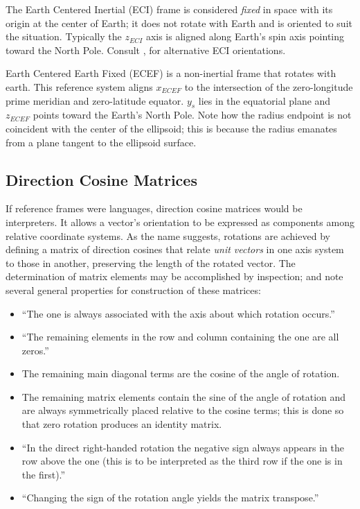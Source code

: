 \documentclass[12pt]{ucthesis}
\begin{document}
The Earth Centered Inertial (ECI) frame is considered \textit{fixed} in space with its origin at the center of Earth; it does not rotate with Earth and is oriented to suit the situation. Typically the $z_{ECI}$ axis is aligned along Earth's spin axis pointing toward the North Pole. Consult \citet[Pg. 20]{Stevens1992}, for alternative ECI orientations.

Earth Centered Earth Fixed (ECEF) is a non-inertial frame that rotates with earth. This reference system aligns  $x_{ECEF}$ to the intersection of the zero-longitude prime meridian and zero-latitude equator. $y_s$ lies in the equatorial plane and $z_{ECEF}$ points toward the Earth's North Pole. Note how the radius endpoint is not coincident with the center of the ellipsoid; this is because the radius emanates from a plane tangent to the ellipsoid surface. 

\subsection{Direction Cosine Matrices}
\label{subsec: new_dcm}
If reference frames were languages, direction cosine matrices would be interpreters. It allows a vector's orientation to be expressed as components among relative coordinate systems. As the name suggests, rotations are achieved by defining a matrix of direction cosines that relate \textit{unit vectors} in one axis system to those in another, preserving the length of the rotated vector. The determination of matrix elements may be accomplished by inspection; \citet{McRuer1973} and \citet{Stevens2003} note several general properties for construction of these matrices:
%
	\begin{itemize}[labelindent=\parindent,leftmargin=*,noitemsep,topsep=0pt,partopsep=0pt]%
		\item ``The one is always associated with the axis about which rotation occurs.''
		\item ``The remaining elements in the row and column containing the one are all zeros.''
		\item The remaining main diagonal terms are the cosine of the angle of rotation.
		\item The remaining matrix elements contain the sine of the angle of rotation and are always symmetrically placed relative to the cosine terms; this is done so that zero rotation produces an identity matrix.
		\item ``In the direct right-handed rotation the negative sign always appears in the row above the one (this is to be interpreted as the third row if the one is in the first).''
		\item ``Changing the sign of the rotation angle yields the matrix transpose.''
	\end{itemize}
\end{document}
